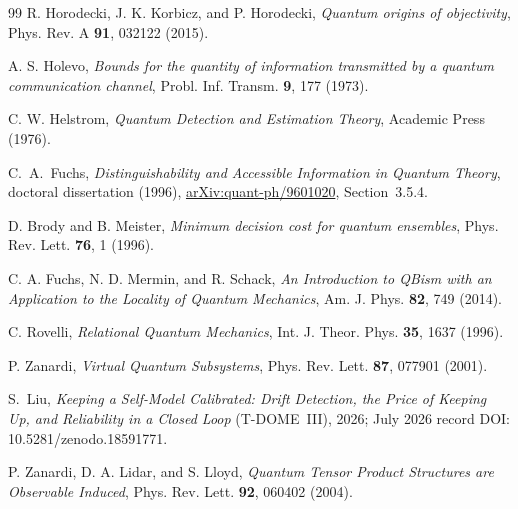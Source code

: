 \documentclass[12pt,a4paper]{article}
\begin{document}
\begin{thebibliography}{99}
R. Horodecki, J. K. Korbicz, and P. Horodecki, \emph{Quantum origins of objectivity}, Phys. Rev. A \textbf{91}, 032122 (2015).

A. S. Holevo, \emph{Bounds for the quantity of information transmitted by a quantum communication channel}, Probl. Inf. Transm. \textbf{9}, 177 (1973).

C. W. Helstrom, \emph{Quantum Detection and Estimation Theory}, Academic Press (1976).

C.~A.~Fuchs, \emph{Distinguishability and Accessible Information in
Quantum Theory}, doctoral dissertation (1996),
\href{https://arxiv.org/abs/quant-ph/9601020}{arXiv:quant-ph/9601020},
Section~3.5.4.

D. Brody and B. Meister, \emph{Minimum decision cost for quantum ensembles}, Phys. Rev. Lett. \textbf{76}, 1 (1996).

C. A. Fuchs, N. D. Mermin, and R. Schack, \emph{An Introduction to QBism with an Application to the Locality of Quantum Mechanics}, Am. J. Phys. \textbf{82}, 749 (2014).

C. Rovelli, \emph{Relational Quantum Mechanics}, Int. J. Theor. Phys. \textbf{35}, 1637 (1996).

P. Zanardi, \emph{Virtual Quantum Subsystems}, Phys. Rev. Lett. \textbf{87}, 077901 (2001).

S.~Liu, \emph{Keeping a Self-Model Calibrated: Drift Detection, the Price of Keeping Up, and Reliability in a Closed Loop} (T-DOME~III), 2026; July 2026 record DOI: 10.5281/zenodo.18591771.

P. Zanardi, D. A. Lidar, and S. Lloyd, \emph{Quantum Tensor Product Structures are Observable Induced}, Phys. Rev. Lett. \textbf{92}, 060402 (2004).

\end{thebibliography}
\end{document}
